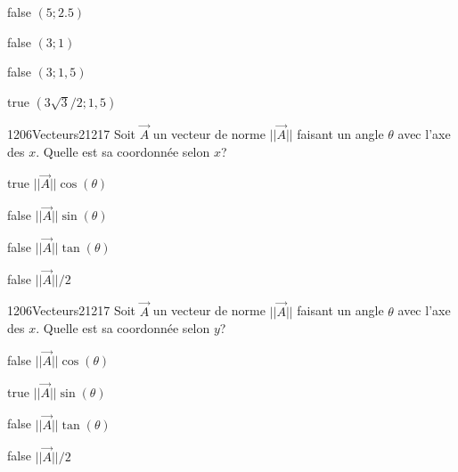             \begin{reponses}
                \item[false] $(5;2.5)$
                \item[false] $(3;1)$
                \item[false] $(3;1,5)$
                \item[true] $(3\sqrt{3}/2;1,5)$
            \end{reponses}
        	\begin{question}{1206}{Vecteurs}{2}{1217}
				Soit $\vec{A}$ un vecteur de norme $||\vec{A}||$ faisant un angle $\theta$ avec l'axe des $x$. Quelle est sa coordonnée selon $x$?
            \end{question}
            \begin{reponses}
            	\item[true] $||\vec{A}||\cos(\theta)$
            	\item[false] $||\vec{A}||\sin(\theta)$
                \item[false] $||\vec{A}||\tan(\theta)$
                \item[false] $||\vec{A}||/2$
            \end{reponses}
        	\begin{question}{1206}{Vecteurs}{2}{1217}
				Soit $\vec{A}$ un vecteur de norme $||\vec{A}||$ faisant un angle $\theta$ avec l'axe des $x$. Quelle est sa coordonnée selon $y$?
            \end{question}
            \begin{reponses}
            	\item[false] $||\vec{A}||\cos(\theta)$
            	\item[true] $||\vec{A}||\sin(\theta)$
                \item[false] $||\vec{A}||\tan(\theta)$
                \item[false] $||\vec{A}||/2$
            \end{reponses}
